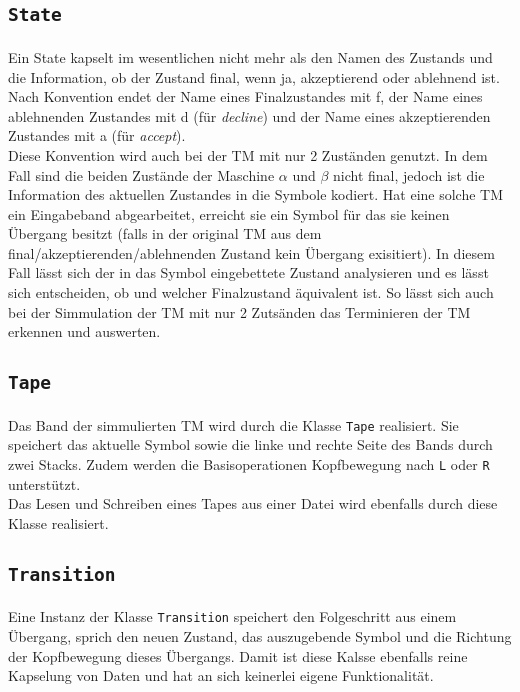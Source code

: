 \documentclass[10pt, a4paper]{article}
\newcommand{\ilc}{\texttt}
\begin{document}
\subsection*{\ilc{State}}
\paragraph*{}
Ein State kapselt im wesentlichen nicht mehr als den Namen des Zustands und die Information, ob der Zustand final, wenn ja, akzeptierend oder ablehnend ist. Nach Konvention endet der Name eines Finalzustandes mit f, der Name eines ablehnenden Zustandes mit d (für \textit{decline}) und der Name eines akzeptierenden Zustandes mit a (für \textit{accept}).\\
Diese Konvention wird auch bei der TM mit nur 2 Zuständen genutzt. In dem Fall sind die beiden Zustände der Maschine $\alpha$ und $\beta$ nicht final, jedoch ist die Information des aktuellen Zustandes in die Symbole kodiert. Hat eine solche TM ein Eingabeband abgearbeitet, erreicht sie ein Symbol für das sie keinen Übergang besitzt (falls in der original TM aus dem final/akzeptierenden/ablehnenden Zustand kein Übergang exisitiert). In diesem Fall lässt sich der in das Symbol eingebettete Zustand analysieren und es lässt sich entscheiden, ob und welcher Finalzustand äquivalent ist. So lässt sich auch bei der Simmulation der TM mit nur 2 Zutsänden das Terminieren der TM erkennen und auswerten.\par

\subsection*{\ilc{Tape}}
\paragraph*{}
Das Band der simmulierten TM wird durch die Klasse \ilc{Tape} realisiert. Sie speichert das aktuelle Symbol sowie die linke und rechte Seite des Bands durch zwei Stacks. Zudem werden die Basisoperationen Kopfbewegung nach \ilc{L} oder \ilc{R} unterstützt.\\
Das Lesen und Schreiben eines Tapes aus einer Datei wird ebenfalls durch diese Klasse realisiert.\par

\subsection*{\ilc{Transition}}
\paragraph*{}
Eine Instanz der Klasse \ilc{Transition} speichert den Folgeschritt aus einem Übergang, sprich den neuen Zustand, das auszugebende Symbol und die Richtung der Kopfbewegung dieses Übergangs. Damit ist diese Kalsse ebenfalls reine Kapselung von Daten und hat an sich keinerlei eigene Funktionalität.
\par
\end{document}
